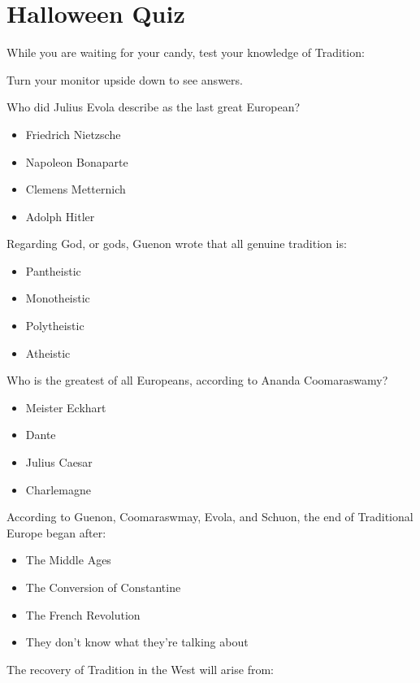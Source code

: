 \section{Halloween Quiz}

While you are waiting for your candy, test your knowledge of Tradition:

Turn your monitor upside down to see answers.

Who did Julius Evola describe as the last great European?

\begin{itemize}
\item Friedrich Nietzsche
\item Napoleon Bonaparte
\item Clemens Metternich
\item Adolph Hitler
\end{itemize}

Regarding God, or gods, Guenon wrote that all genuine tradition is:

\begin{itemize}
\item Pantheistic
\item Monotheistic
\item Polytheistic
\item Atheistic
\end{itemize}

Who is the greatest of all Europeans, according to Ananda Coomaraswamy?

\begin{itemize}
\item Meister Eckhart
\item Dante
\item Julius Caesar
\item Charlemagne
\end{itemize}

According to Guenon, Coomaraswmay, Evola, and Schuon, the end of Traditional Europe began after:

\begin{itemize}
\item The Middle Ages
\item The Conversion of Constantine
\item The French Revolution
\item They don't know what they're talking about
\end{itemize}

The recovery of Tradition in the West will arise from:

